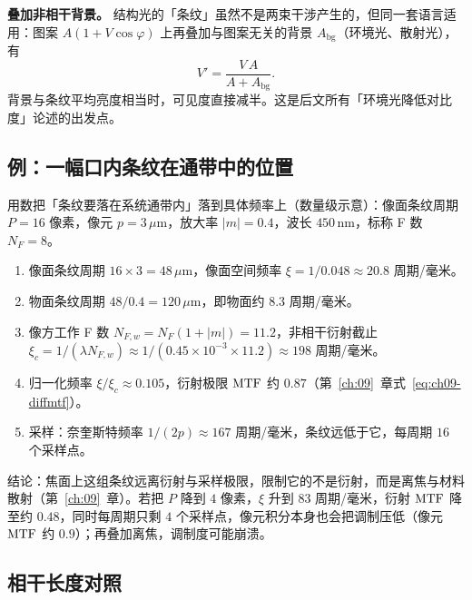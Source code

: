 \textbf{叠加非相干背景。} 结构光的「条纹」虽然不是两束干涉产生的，但同一套语言适用：图案 $A(1+V\cos\varphi)$ 上再叠加与图案无关的背景 $A_{\mathrm{bg}}$（环境光、散射光），有
\[
  V'=\frac{V\,A}{A+A_{\mathrm{bg}}}.
\]
背景与条纹平均亮度相当时，可见度直接减半。这是后文所有「环境光降低对比度」论述的出发点。

\subsection{例：一幅口内条纹在通带中的位置}

用数把「条纹要落在系统通带内」落到具体频率上（数量级示意）：像面条纹周期 $P=16$ 像素，像元 $p=3\,\mu\mathrm{m}$，放大率 $|m|=0.4$，波长 $450\,\mathrm{nm}$，标称 F 数 $N_F=8$。
\begin{enumerate}
  \item 像面条纹周期 $16\times3=48\,\mu\mathrm{m}$，像面空间频率 $\xi=1/0.048\approx20.8$ 周期/毫米。
  \item 物面条纹周期 $48/0.4=120\,\mu\mathrm{m}$，即物面约 $8.3$ 周期/毫米。
  \item 像方工作 F 数 $N_{F,w}=N_F(1+|m|)=11.2$，非相干衍射截止 $\xi_c=1/(\lambda N_{F,w})\approx1/(0.45\times10^{-3}\times11.2)\approx198$ 周期/毫米。
  \item 归一化频率 $\xi/\xi_c\approx0.105$，衍射极限 $\mathrm{MTF}$ 约 $0.87$（第~\ref{ch:09}~章式~\eqref{eq:ch09-diffmtf}）。
  \item 采样：奈奎斯特频率 $1/(2p)\approx167$ 周期/毫米，条纹远低于它，每周期 $16$ 个采样点。
\end{enumerate}
结论：焦面上这组条纹远离衍射与采样极限，限制它的不是衍射，而是离焦与材料散射（第~\ref{ch:09}~章）。若把 $P$ 降到 $4$ 像素，$\xi$ 升到 $83$ 周期/毫米，衍射 $\mathrm{MTF}$ 降至约 $0.48$，同时每周期只剩 $4$ 个采样点，像元积分本身也会把调制压低（像元 $\mathrm{MTF}$ 约 $0.9$）；再叠加离焦，调制度可能崩溃。

\subsection{相干长度对照}

